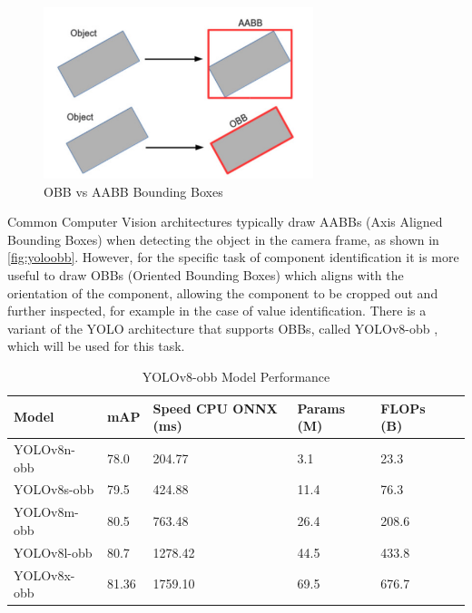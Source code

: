 \begin{figure}[H]
    \begin{minipage}[h]{\textwidth}
        \centering
        \includegraphics[height=5cm]{imgs/software/yoloobb.png}
        \caption{OBB vs AABB Bounding Boxes \cite{aabbphoto}}
        \label{fig:yoloobb}
    \end{minipage}
\end{figure}

Common Computer Vision architectures typically draw AABBs (Axis Aligned Bounding Boxes) when detecting the object in the camera frame, as shown in \autoref{fig:yoloobb}. However, for the specific task of component identification it is more useful to draw OBBs (Oriented Bounding Boxes) which aligns with the orientation of the component, allowing the component to be cropped out and further inspected, for example in the case of value identification. There is a variant of the YOLO architecture that supports OBBs, called YOLOv8-obb \cite{yolov8}, which will be used for this task. 

\begin{table}[H]
    \centering
    {\fontsize{12pt}{14pt}\selectfont
    \begin{tabular}{|l|l|l|l|l|l|}
        \hline
        \textbf{Model} & \textbf{mAP\raisebox{-1pt}{\textsuperscript{50}}} & \textbf{Speed CPU ONNX (ms)} & \textbf{Params (M)} & \textbf{FLOPs (B)} \\
        \hline
        YOLOv8n-obb & 78.0 & 204.77 & 3.1 & 23.3 \\
        \hline
        YOLOv8s-obb & 79.5 & 424.88 & 11.4 & 76.3 \\
        \hline
        YOLOv8m-obb & 80.5 & 763.48 & 26.4 & 208.6 \\
        \hline
        YOLOv8l-obb & 80.7 & 1278.42 & 44.5 & 433.8 \\
        \hline
        YOLOv8x-obb & 81.36 & 1759.10 & 69.5 & 676.7 \\
        \hline
    \end{tabular}
    }
    \caption{YOLOv8-obb Model Performance \cite{yolov8}}
    \label{tab:yoloperformanceobb}
\end{table}

